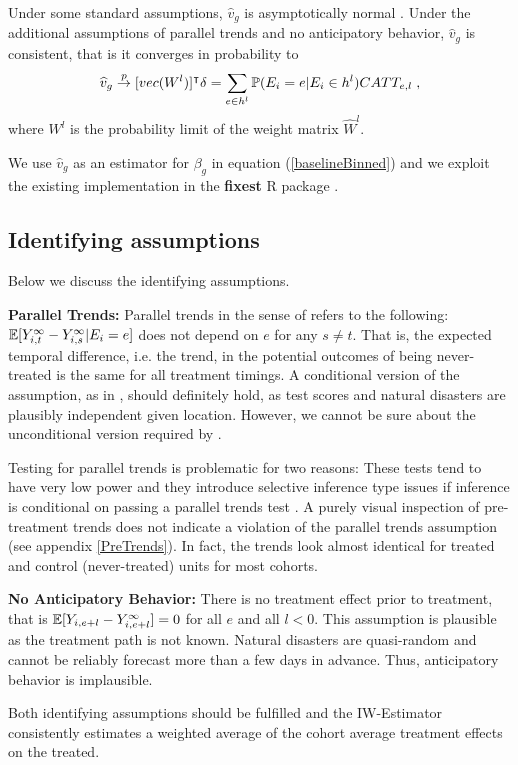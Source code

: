 Under some standard assumptions, $\widehat{v}_g$ is asymptotically normal \citep[for a proof and a detailed description of said assumptions see][Appendix C]{Sun_2021}. Under the additional assumptions of parallel trends and no anticipatory behavior, $\widehat{v}_g$ is consistent, that is it converges in probability to
\begin{align*}
	\widehat{v}_g \overset{p}{\to} [vec(W^{l})]^\intercal \delta = \sum_{e \in h^{l}} \mathbb{P}(E_i = e | E_i \in h^{l}) CATT_{e, l} \; ,
\end{align*}
where $W^{l}$ is the probability limit of the weight matrix $\widehat{W}^l$.

We use $\widehat{v}_g$ as an estimator for $\beta_{g}$ in equation (\ref{baselineBinned}) and we exploit the existing implementation in the \textbf{fixest} R package \citep{Berge_2018}.

\subsection{Identifying assumptions}

Below we discuss the identifying assumptions.

\textbf{Parallel Trends:} Parallel trends in the sense of \cite{Sun_2021} refers to the following: $\mathbb{E}[Y_{i, t}^{\infty} - Y_{i, s}^{\infty} | E_i = e]$ does not depend on $e$ for any $s \neq t$. That is, the expected temporal difference, i.e. the trend, in the potential outcomes of being never-treated is the same for all treatment timings. A conditional version of the assumption, as in \cite{Callaway_2021}, should definitely hold, as test scores and natural disasters are plausibly independent given location. However, we cannot be sure about the unconditional version required by \cite{Sun_2021}.

Testing for parallel trends is problematic for two reasons: These tests tend to have very low power and they introduce selective inference type issues if inference is conditional on passing a parallel trends test \citep{Rambachan_2019}. A purely visual inspection of pre-treatment trends does not indicate a violation of the parallel trends assumption (see appendix \ref{PreTrends}). In fact, the trends look almost identical for treated and control (never-treated) units for most cohorts.

\textbf{No Anticipatory Behavior:} There is no treatment effect prior to treatment, that is $\mathbb{E}[Y_{i, e+l} - Y_{i, e+l}^{\infty}] = 0$ for all $e$ and all $l < 0$. This assumption is plausible as the treatment path is not known. Natural disasters are quasi-random and cannot be reliably forecast more than a few days in advance. Thus, anticipatory behavior is implausible.

Both identifying assumptions should be fulfilled and the IW-Estimator consistently estimates a weighted average of the cohort average treatment effects on the treated.




